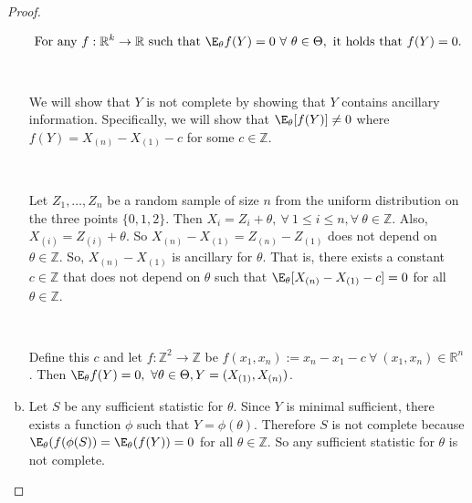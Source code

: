 \begin{proof}
\begin{enumerate}[(a)]
{{\begin{definition}
\[
\text{For any } f: \mathbb{R}^k \to \mathbb{R} \text{ such that } \E_\theta f(Y) = 0 \ \forall \ \theta \in \Theta, \text{ it holds that } f(Y) = 0.
\]

\end{definition}
}
}

\

We will show that \(Y\) is not complete by showing that \(Y\) contains ancillary information. Specifically, we will show that \(\E_\theta [f(Y)] \neq 0\) where \(f(Y) = X_{(n)} - X_{(1)} - c\) for some \(c \in \mathbb{Z}\).

\

Let \(Z_1, \ldots, Z_n\) be a random sample of size \(n\) from the uniform distribution on the three points \( \{ 0, 1, 2\}\). Then \(X_i = Z_i + \theta, \ \forall \ 1 \leq i \leq n, \forall \ \theta \in \mathbb{Z}\). Also, \(X_{(i)} = Z_{(i)} + \theta\). So \(X_{(n)} - X_{(1)} = Z_{(n)} - Z_{(1)}\) does not depend on \(\theta \in \mathbb{Z}\). So, \(X_{(n)} - X_{(1)}\) is ancillary for \(\theta\). That is, there exists a constant \(c \in \mathbb{Z}\) that does not depend on \(\theta\) such that \(\E_\theta[X_{(n)} - X_{(1)} - c] = 0\) for all \(\theta \in \mathbb{Z}\). 

\

Define this \(c\) and let \(f: \mathbb{Z}^2 \to \mathbb{Z}\) be \(f(x_1, x_n) := x_n - x_1 - c \ \forall \ (x_1, x_n) \in \mathbb{R}^n\). Then \(\E_\theta f(Y) = 0, \ \forall \theta \in \Theta, Y  = (X_{(1)}, X_{(n)})\). 


\item Let \(S\) be any sufficient statistic for \(\theta\). Since \(Y\) is minimal sufficient, there exists a function \(\phi\) such that \(Y = \phi(\theta)\). Therefore \(S\) is not complete because \(\E_\theta(f(\phi(S)) = \E_\theta(f(Y)) = 0\) for all \(\theta \in \mathbb{Z}\). So any sufficient statistic for \(\theta\) is not complete.

\end{enumerate}

\end{proof}




